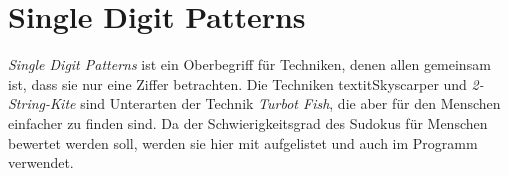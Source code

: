 \newpage
\section{Single Digit Patterns}
\textit{Single Digit Patterns} ist ein Oberbegriff für Techniken, denen allen gemeinsam ist, dass sie nur eine Ziffer betrachten. Die Techniken textit{Skyscarper} und \textit{2-String-Kite} sind Unterarten der Technik \textit{Turbot Fish}, die aber für den Menschen einfacher zu finden sind. Da der Schwierigkeitsgrad des Sudokus für Menschen bewertet werden soll, werden sie hier mit aufgelistet und auch im Programm verwendet.